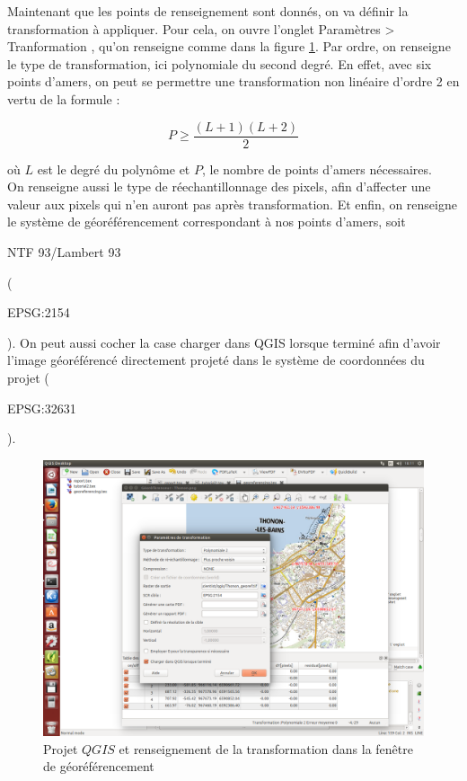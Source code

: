 \documentclass{book}
\begin{document}
\clearpage

Maintenant que les points de renseignement sont donnés, on va définir la transformation à appliquer. Pour cela, on ouvre l'onglet
 \og Paramètres > Tranformation \fg{}, qu'on renseigne comme dans la figure \ref{qgis-transformation}. Par ordre, 
on renseigne le type de transformation, ici polynomiale du second degré. En effet, avec six points d'amers, on peut se permettre
une transformation non linéaire d'ordre 2 en vertu de la formule \cite{Nicolas:2014}:

\[P\ge\frac{(L+1)(L+2)}{2}\]

où $L$ est le degré du polyn\^{o}me et $P$, le nombre de points d'amers nécessaires.\\
On renseigne aussi le type de réechantillonnage des pixels, afin d'affecter une valeur aux pixels qui n'en auront pas
après transformation. Et enfin, on renseigne le système de géoréférencement correspondant 
à nos points d'amers, soit \begin{itshape}NTF 93/Lambert 93\end{itshape} (\begin{itshape}EPSG:2154\end{itshape}). On peut aussi
 cocher la case \og charger dans QGIS lorsque terminé \fg{} afin d'avoir l'image géoréférencé directement
 projeté dans le système de coordonnées du projet (\begin{itshape}EPSG:32631\end{itshape}).

\begin{figure}[H]
\begin{center}
\includegraphics[scale=0.3]{images/georeferencing/qgis-transformation.png}
\end{center}
\caption{Projet $QGIS$ et renseignement de la transformation dans la fen\^{e}tre de géoréférencement}
\label{qgis-transformation}
\end{figure}
\end{document}
